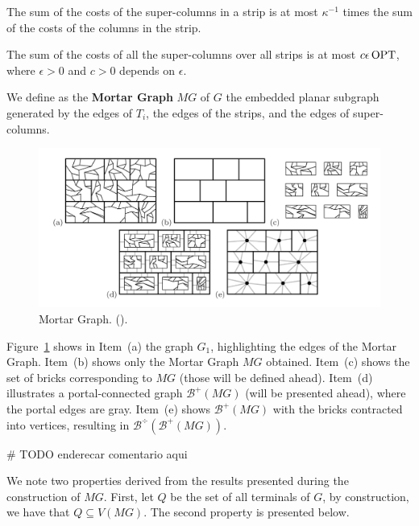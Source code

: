 \begin{flemma}
The sum of the costs of the super-columns in a strip is at most \(\kappa^{-1}\) times the sum of the costs of the columns in the strip.
\end{flemma}

\begin{flemma} \label{borradaile_2009b_lemma_6_6}
     The sum of the costs of all the super-columns over all strips is at most \(c \epsilon \operatorname{\textrm{OPT}}\), where \(\epsilon > 0\) and \(c > 0\) depends on \(\epsilon\).
\end{flemma}

We define as the \textbf{Mortar Graph} \(MG\) of \(G\) the embedded planar subgraph generated by the edges of \(T_i\), the edges of the strips, and the edges of super-columns.

\begin{figure}[h]
    \centering
    \includegraphics[scale=0.4]{imgs/mortar3.png}
    \caption{Mortar Graph. (\cite{Borradaile2009b}).}
    \label{fig:mortar3}
\end{figure}

Figure~\ref{fig:mortar3} shows in Item~(a) the graph \(G_1\), highlighting the edges of the Mortar Graph. 
Item~(b) shows only the Mortar Graph \(MG\) obtained. 
Item~(c) shows the set of bricks corresponding to \(MG\) (those will be defined ahead). 
Item~(d) illustrates a portal-connected graph \(\mathcal{B}^{+}(MG)\) (will be presented ahead), where the portal edges are gray. 
Item~(e) shows \(\mathcal{\mathcal{B}}^{+}(MG)\) with the bricks contracted into vertices, resulting in \(\mathcal{B}^{\div}(\mathcal{B }^{+}(MG))\).

# TODO enderecar comentario aqui

We note two properties derived from the results presented during the construction of \(MG\). First, let \(Q\) be the set of all terminals of \(G\), by construction, we have that \(Q \subseteq V(MG)\). The second property is presented below.

